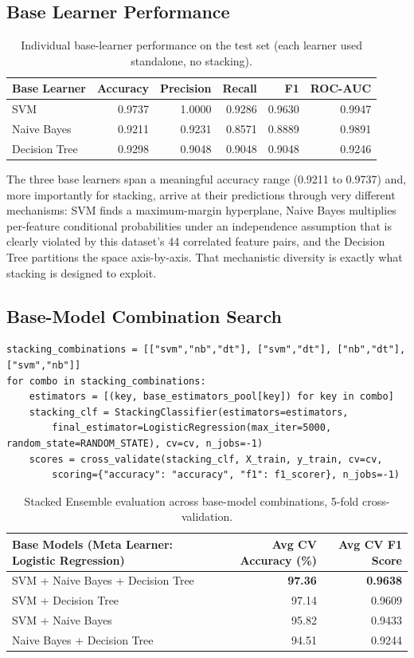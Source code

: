 \documentclass[11pt,a4paper]{article}
\begin{document}
\subsection{Base Learner Performance}
\begin{table}[h]
\centering
\begin{tabular}{@{}lrrrrr@{}}
\toprule
Base Learner & Accuracy & Precision & Recall & F1 & ROC-AUC \\
\midrule
SVM & 0.9737 & 1.0000 & 0.9286 & 0.9630 & 0.9947 \\
Naive Bayes & 0.9211 & 0.9231 & 0.8571 & 0.8889 & 0.9891 \\
Decision Tree & 0.9298 & 0.9048 & 0.9048 & 0.9048 & 0.9246 \\
\bottomrule
\end{tabular}
\caption{Individual base-learner performance on the test set (each learner used standalone, no stacking).}
\end{table}
The three base learners span a meaningful accuracy range (0.9211 to 0.9737) and, more importantly for stacking, arrive at their predictions through very different mechanisms: SVM finds a maximum-margin hyperplane, Naive Bayes multiplies per-feature conditional probabilities under an independence assumption that is clearly violated by this dataset's 44 correlated feature pairs, and the Decision Tree partitions the space axis-by-axis. That mechanistic diversity is exactly what stacking is designed to exploit.

\subsection{Base-Model Combination Search}
\begin{lstlisting}
stacking_combinations = [["svm","nb","dt"], ["svm","dt"], ["nb","dt"], ["svm","nb"]]
for combo in stacking_combinations:
    estimators = [(key, base_estimators_pool[key]) for key in combo]
    stacking_clf = StackingClassifier(estimators=estimators,
        final_estimator=LogisticRegression(max_iter=5000, random_state=RANDOM_STATE), cv=cv, n_jobs=-1)
    scores = cross_validate(stacking_clf, X_train, y_train, cv=cv,
        scoring={"accuracy": "accuracy", "f1": f1_scorer}, n_jobs=-1)
\end{lstlisting}

\begin{table}[h]
\centering
\begin{tabular}{@{}lrr@{}}
\toprule
Base Models (Meta Learner: Logistic Regression) & Avg CV Accuracy (\%) & Avg CV F1 Score \\
\midrule
SVM + Naive Bayes + Decision Tree & \textbf{97.36} & \textbf{0.9638} \\
SVM + Decision Tree & 97.14 & 0.9609 \\
SVM + Naive Bayes & 95.82 & 0.9433 \\
Naive Bayes + Decision Tree & 94.51 & 0.9244 \\
\bottomrule
\end{tabular}
\caption{Stacked Ensemble evaluation across base-model combinations, 5-fold cross-validation.}
\end{table}
\end{document}
